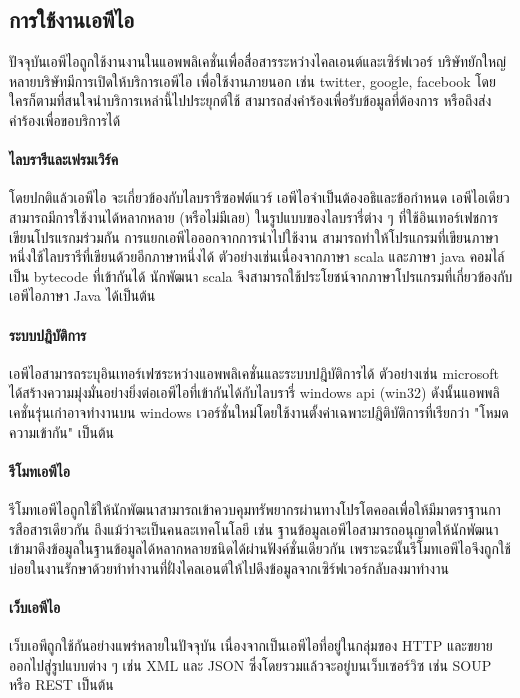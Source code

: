   \subsection*{การใช้งานเอพีไอ} ปัจจุบันเอพีไอถูกใช้งานงานในแอพพลิเคชั่นเพื่อสื่อสารระหว่างไคลเอนต์และเซิร์ฟเวอร์ บริษัทยักใหญ่หลายบริษัทมีการเปิดให้บริการเอพีไอ เพื่อใช้งานภายนอก เช่น twitter, google, facebook โดยใครก็ตามที่สนใจนำบริการเหล่านี้ไปประยุกต์ใช้ สามารถส่งคำร้องเพื่อรับข้อมูลที่ต้องการ หรือถึงส่งคำร้องเพื่อขอบริการได้
    \paragraph*{ไลบรารีและเฟรมเวิร์ค} 
      โดยปกติแล้วเอพีไอ จะเกี่ยวข้องกับไลบรารีซอฟต์แวร์ เอพีไอจำเป็นต้องอธิและข้อกำหนด เอพีไอเดียวสามารถมีการใช้งานได้หลากหลาย (หรือไม่มีเลย) ในรูปแบบของไลบรารี่ต่าง ๆ ที่ใช้อินเทอร์เฟชการเขียนโปรแรกมร่วมกัน การแยกเอพีไอออกจากการนำไปใช้งาน สามารถทำให้โปรแกรมที่เขียนภาษาหนึ่งใช้ไลบรารีที่เขียนด้วยอีกภาษาหนึ่งได้ ตัวอย่างเช่นเนื่องจากภาษา scala และภาษา java คอมไล์เป็น bytecode ที่เข้ากันได้ นักพัฒนา scala จึงสามารถใช้ประโยชน์จากภาษาโปรแกรมที่เกี่ยวข้องกับเอพีไอภาษา Java ได้เป็นต้น \par
    \paragraph*{ระบบปฎิบัติการ}
      เอพีไอสามารถระบุอินเทอร์เฟซระหว่างแอพพลิเคชั่นและระบบปฎิบัติการได้ ตัวอย่างเช่น microsoft ได้สร้างความมุ่งมั่นอย่างยิ่งต่อเอพีไอที่เข้ากันได้กับไลบรารี่ windows api (win32) ดังนั้นแอพพลิเคชั่นรุ่นเก่าอาจทำงานบน windows เวอร์ชั่นใหม่โดยใช้งานตั้งค่าเฉพาะปฎิติบัติการที่เรียกว่า "โหมดความเข้ากัน" เป็นต้น
    \paragraph*{รีโมทเอพีไอ}
      รีโมทเอพีไอถูกใช้ให้นักพัฒนาสามารถเข้าควบคุมทรัพยากรผ่านทางโปรโตคอลเพื่อให้มีมาตราฐานการสือสารเดียวกัน ถึงแม้ว่าจะเป็นคนละเทคโนโลยี เช่น ฐานข้อมูลเอพีไอสามารถอนุญาตให้นักพัฒนาเข้ามาดึงข้อมูลในฐานข้อมูลได้หลากหลายชนิดได้ผ่านฟังค์ชั่นเดียวกัน เพราะฉะนั้นรีโมทเอพีไอจึงถูกใช้บ่อยในงานรักษาด้วยทำทำงานที่ฝั่งไคลเอนต์ให้ไปดึงข้อมูลจากเซิร์ฟเวอร์กลับลงมาทำงาน
    \paragraph*{เว็บเอพีไอ}
      เว็บเอพีถูกใช้กันอย่างแพร่หลายในปัจจุบัน เนื่องจากเป็นเอพีไอที่อยู่ในกลุ่มของ HTTP และขยายออกไปสู่รูปแบบต่าง ๆ เช่น XML และ JSON ซึ่งโดยรวมแล้วจะอยู่บนเว็บเซอร์วิซ เช่น SOUP หรือ REST เป็นต้น

